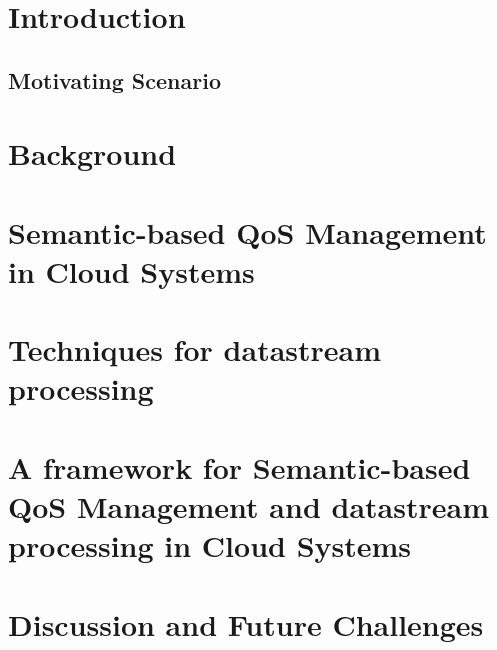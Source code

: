 \documentclass[preprint,12pt]{elsarticle}
\begin{document}
\section{Introduction}

\subsection{Motivating Scenario}\label{motivating}

\section{Background}

\section{Semantic-based QoS Management in Cloud Systems}\label{qos-semantics}

\section{Techniques for datastream processing}\label{data-stream}

\section{A framework for Semantic-based QoS Management and datastream processing in Cloud Systems}\label{framework}

% 
\section{Discussion and Future Challenges}\label{discussion}

\end{document}
